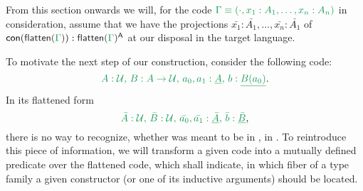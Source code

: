 From this section onwards we will, for the code $\grm{\Gamma \equiv (\cdot, x_1 : A_1, \ldots, x_n : A_n)}$
in consideration, assume that we have the projections $\bar{x_1} : \bar{A_1}, \ldots, \bar{x_n} : \bar{A_1}$ of
$\con{\grm{\flatten{\Gamma}}} : \grm{\flatten{\Gamma}}^\CC$ at our disposal in the target
language.

To motivate the next step of our construction, consider the following code:
\begin{equation*}
\grm{
A : \UU,\, B : A \to \UU,\, a_0, a_1 : \underline{A},\, b : \underline{B(a_0)}
} \text{.}
\end{equation*}
In its flattened form
\begin{equation*}
\grm{
\bar{A} : \UU,\, \bar{B} : \UU,\, \bar{a_0}, \bar{a_1} : \underline{\bar{A}},\, \bar{b} : \underline{\bar{B}}
} \text{,}
\end{equation*}
there is no way to recognize, whether  was meant to be in ,
in .
To reintroduce this piece of information, we will transform a given code into a
mutually defined predicate over the flattened code, which shall indicate, in which
fiber of a type family a given constructor (or one of its inductive arguments)
should be located.

